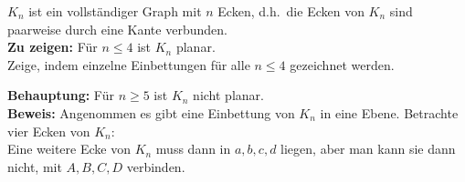 \begin{problem}[2a]
  \( K_n \) ist ein vollständiger Graph mit \( n \) Ecken, d.h.\ die Ecken von \( K_n \) sind paarweise durch eine Kante verbunden. \\
  \textbf{Zu zeigen:} Für \( n \leq 4 \) ist \( K_n \) planar. \\
  Zeige, indem einzelne Einbettungen für alle \( n \leq 4 \) gezeichnet werden. \\
\end{problem}

\begin{problem}[2b]
  \textbf{Behauptung:} Für \( n \geq 5 \) ist \( K_n \) nicht planar. \\
  \textbf{Beweis:} Angenommen es gibt eine Einbettung von \( K_n \) in eine Ebene. Betrachte vier Ecken von \( K_n \): \\


  Eine weitere Ecke von \( K_n \) muss dann in \( a,b,c,d \) liegen, aber man kann sie dann nicht, mit \( A, B, C, D \) verbinden.
\end{problem}

